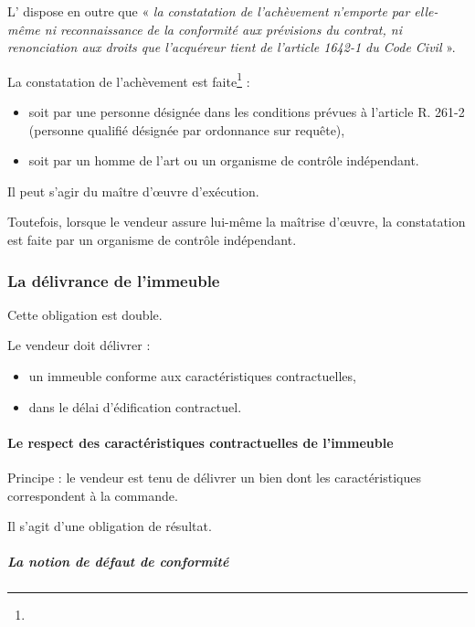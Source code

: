 			L’ dispose en outre que « {\itshape la constatation de l’achèvement n’emporte par elle-même ni reconnaissance de la conformité aux prévisions du contrat, ni renonciation aux droits que l’acquéreur tient de l’article 1642-1 du Code Civil} ».


			\medbreak La constatation de l’achèvement est faite\footnote{}  :
			\begin{itemize}
				\item soit par une personne désignée dans les conditions prévues à l'article R. 261-2 (personne qualifié désignée par ordonnance sur requête),

				\item soit par un homme de l'art ou un organisme de contrôle indépendant.
			\end{itemize}

			Il peut s’agir du maître d’œuvre d’exécution.

			Toutefois, lorsque le vendeur assure lui-même la maîtrise d'œuvre, la constatation est faite par un organisme de contrôle indépendant.


		\subsubsection{La délivrance de l'immeuble }

			Cette obligation est double.

			Le vendeur doit délivrer :
			\begin{itemize}
				\item un immeuble conforme aux caractéristiques contractuelles,
				\item dans le délai d’édification contractuel.
			\end{itemize}


			\paragraph{Le respect des caractéristiques contractuelles de l'immeuble}

				Principe : le vendeur est tenu de délivrer un bien dont les caractéristiques correspondent à la commande.

				Il s’agit d’une obligation de résultat.

				\subparagraph{La notion de défaut de conformité}

